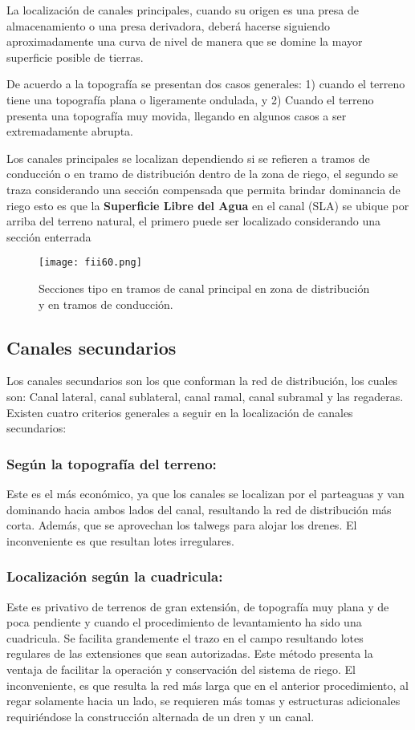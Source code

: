 La localización de canales principales, cuando su origen es una presa de
almacenamiento o una presa derivadora, deberá hacerse siguiendo aproximadamente
una curva de nivel de manera que se domine la mayor superficie posible de tierras.

De acuerdo a la topografía se presentan dos casos generales: 1) cuando el
terreno tiene una topografía plana o ligeramente ondulada, y 2) Cuando el terreno
presenta una topografía muy movida, llegando en algunos casos a ser extremadamente
abrupta.

Los canales principales se localizan dependiendo si se refieren a tramos de
conducción o en tramo de distribución dentro de la zona de riego, el segundo se traza
considerando una sección compensada que permita brindar dominancia de riego esto
es que la \textbf{Superficie Libre del Agua} en el canal (SLA) se ubique por arriba del terreno
natural, el primero puede ser localizado considerando una sección enterrada

\begin{figure}[h!]
	\centerline{\texttt{[image: fii60.png]}}
	\caption {Secciones tipo en tramos de canal principal en zona de distribución y en tramos de conducción.}
	\label{fii60}
\end{figure}

\subsection{Canales secundarios}

Los canales secundarios son los que conforman la red de distribución, los cuales
son: Canal lateral, canal sublateral, canal ramal, canal subramal y las regaderas.
Existen cuatro criterios generales a seguir en la localización de canales
secundarios:

\subsubsection{Según la topografía del terreno:}
Este es el más económico, ya que los canales se localizan por el parteaguas y
van dominando hacia ambos lados del canal, resultando la red de distribución más
corta. Además, que se aprovechan los talwegs para alojar los drenes. El inconveniente
es que resultan lotes irregulares.

\subsubsection{Localización según la cuadricula:} Este es privativo de terrenos de gran extensión, de topografía muy plana y de
poca pendiente y cuando el procedimiento de levantamiento ha sido una cuadricula. Se
facilita grandemente el trazo en el campo resultando lotes regulares de las extensiones
que sean autorizadas. Este método presenta la ventaja de facilitar la operación y
conservación del sistema de riego. El inconveniente, es que resulta la red más larga
que en el anterior procedimiento, al regar solamente hacia un lado, se requieren más
tomas y estructuras adicionales requiriéndose la construcción alternada de un dren y un
canal.

